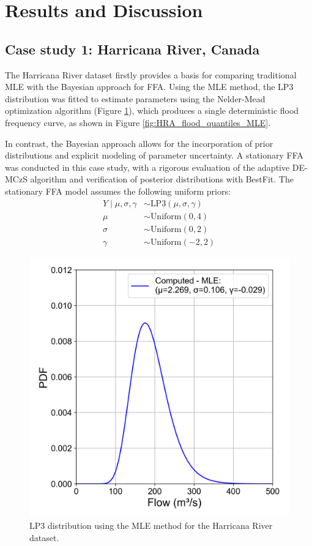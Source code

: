 \section{Results and Discussion}

\subsection{Case study 1: Harricana River, Canada}
The Harricana River dataset firstly provides a basis for comparing traditional MLE with the Bayesian approach for FFA. Using the MLE method, the LP3 distribution was fitted to estimate parameters using the Nelder-Mead
optimization algorithm (Figure \ref{fig:HRA_LP3_MLE}), which produces a single deterministic flood frequency curve, as shown in Figure \ref{fig:HRA_flood_quantiles_MLE}. 

In contrast, the Bayesian approach allows for the incorporation of prior distributions and explicit modeling of parameter uncertainty. A stationary FFA was conducted in this case study, with a rigorous evaluation of the adaptive DE-MCzS algorithm and verification of posterior distributions with BestFit. The stationary FFA model assumes the following uniform priors:
\begin{align*}
    Y \mid \mu, \sigma, \gamma &\sim \text{LP3}(\mu, \sigma, \gamma)\\
    \mu &\sim \text{Uniform}(0,4)\\
    \sigma &\sim \text{Uniform}(0,2)\\
    \gamma &\sim \text{Uniform}(-2,2)
\end{align*}

\begin{figure}[ht!]
    \centering
    \includegraphics[width=1\linewidth]{_plots/HRA_LP3_MLE.png}
    \caption{LP3 distribution using the MLE method for the Harricana River dataset.}
    \label{fig:HRA_LP3_MLE}
\end{figure}

